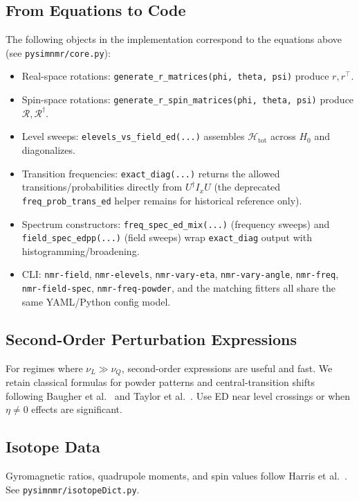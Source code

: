 \documentclass[12pt]{article}
\begin{document}
\subsection{From Equations to Code}
The following objects in the implementation correspond to the equations above (see \verb|pysimnmr/core.py|):
\begin{itemize}
  \item Real-space rotations: \verb|generate_r_matrices(phi, theta, psi)| produce \(r, r^{\top}\).
  \item Spin-space rotations: \verb|generate_r_spin_matrices(phi, theta, psi)| produce \(\mathcal{R}, \mathcal{R}^{\dagger}\).
  \item Level sweeps: \verb|elevels_vs_field_ed(...)| assembles \(\mathcal{H}_{\mathrm{tot}}\) across \(H_0\) and diagonalizes.
  \item Transition frequencies: \verb|exact_diag(...)| returns the allowed transitions/probabilities directly from \(U^{\dagger} I_x U\) (the deprecated \verb|freq_prob_trans_ed| helper remains for historical reference only).
  \item Spectrum constructors: \verb|freq_spec_ed_mix(...)| (frequency sweeps) and \verb|field_spec_edpp(...)| (field sweeps) wrap \verb|exact_diag| output with histogramming/broadening.
  \item CLI: \verb|nmr-field|, \verb|nmr-elevels|, \verb|nmr-vary-eta|, \verb|nmr-vary-angle|, \verb|nmr-freq|, \verb|nmr-field-spec|, \verb|nmr-freq-powder|, and the matching fitters all share the same YAML/Python config model.
\end{itemize}

\subsection{Second-Order Perturbation Expressions}
For regimes where \(\nu_L\gg\nu_Q\), second-order expressions are useful and fast. We retain classical formulas for powder patterns and central-transition shifts following Baugher et al.~\cite{Baugher_1969_NMR_powder_patterns} and Taylor et al.~\cite{Taylor_1975_NMR_powder_patterns}. Use ED near level crossings or when \(\eta\neq 0\) effects are significant.

\subsection{Isotope Data}
Gyromagnetic ratios, quadrupole moments, and spin values follow Harris et al.~\cite{Harris_2001_NMR_nomenclature}. See \verb|pysimnmr/isotopeDict.py|.
\end{document}
